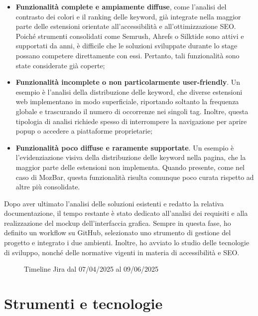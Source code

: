 \begin{itemize}
  \item \textbf{Funzionalità complete e ampiamente diffuse}, come l’analisi del contrasto dei colori e il ranking delle keyword, già integrate nella maggior parte delle estensioni orientate all’accessibilità e all’ottimizzazione SEO. Poiché strumenti consolidati come Semrush, Ahrefs o Silktide sono attivi e supportati da anni, è difficile che le soluzioni sviluppate durante lo stage possano competere direttamente con essi. Pertanto, tali funzionalità sono state considerate già coperte;
  \item \textbf{Funzionalità incomplete o non particolarmente user-friendly}. Un esempio è l’analisi della distribuzione delle keyword, che diverse estensioni web implementano in modo superficiale, riportando soltanto la frequenza globale e trascurando il numero di occorrenze nei singoli tag. Inoltre, questa tipologia di analisi richiede spesso di interrompere la navigazione per aprire popup o accedere a piattaforme proprietarie;
  \item \textbf{Funzionalità poco diffuse e raramente supportate}. Un esempio è l’evidenziazione visiva della distribuzione delle keyword nella pagina, che la maggior parte delle estensioni non implementa. Quando presente, come nel caso di MozBar, questa funzionalità risulta comunque poco curata rispetto ad altre più consolidate.
\end{itemize}

\par\noindent Dopo aver ultimato l’analisi delle soluzioni esistenti e redatto la relativa documentazione, il tempo restante è stato dedicato all’analisi dei requisiti e alla realizzazione del mockup dell’interfaccia grafica. Sempre in questa fase, ho definito un workflow su GitHub, selezionato uno strumento di gestione del progetto e integrato i due ambienti. Inoltre, ho avviato lo studio delle tecnologie di sviluppo, nonché delle normative vigenti in materia di accessibilità e SEO.

\begin{figure}[H]
  \centering 
  \caption{Timeline Jira dal 07/04/2025 al 09/06/2025}
\end{figure}

\section{Strumenti e tecnologie}
\label{sec:strumenti-tecnologie}


